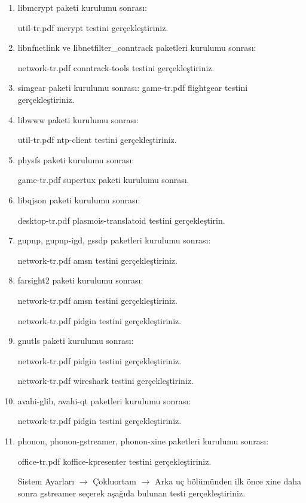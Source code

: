 \documentclass[a4paper,10pt]{article}
\begin{document}
\begin{enumerate}
\item libmcrypt paketi kurulumu sonrası:

util-tr.pdf mcrypt testini gerçekleştiriniz.

\item libnfnetlink ve libnetfilter\_conntrack paketleri kurulumu sonrası:

network-tr.pdf conntrack-tools testini gerçekleştiriniz.

\item simgear paketi kurulumu sonrası:
game-tr.pdf flightgear testini gerçekleştiriniz.

\item libwww paketi kurulumu sonrası:

util-tr.pdf ntp-client testini gerçekleştiriniz.

\item physfs paketi kurulumu sonrası:

game-tr.pdf supertux paketi kurulumu sonrası.

\item libqjson paketi kurulumu sonrası:

desktop-tr.pdf plasmois-translatoid testini gerçekleştirin.

\item gupnp, gupnp-igd, gssdp paketleri kurulumu sonrası:

network-tr.pdf amsn testini gerçekleştiriniz.

\item farsight2 paketi kurulumu sonrası:

network-tr.pdf amsn testini gerçekleştiriniz.

network-tr.pdf pidgin testini gerçekleştiriniz.

\item gnutls paketi kurulumu sonrası:

network-tr.pdf pidgin testini gerçekleştiriniz.

network-tr.pdf wireshark testini gerçekleştiriniz.

\item avahi-glib, avahi-qt paketleri kurulumu sonrası:

network-tr.pdf pidgin testini gerçekleştiriniz.

\item phonon, phonon-gstreamer, phonon-xine paketleri kurulumu sonrası:

office-tr.pdf koffice-kpresenter testini gerçekleştiriniz.

Sistem Ayarları $\rightarrow$ Çokluortam $\rightarrow$ Arka uç bölümünden ilk önce xine daha sonra gstreamer seçerek aşağıda bulunan testi gerçekleştiriniz.


\end{enumerate}
\end{document}
